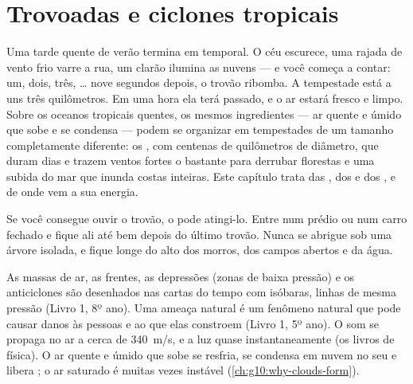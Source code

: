 \chapter{Trovoadas e ciclones tropicais}\label{ch:g10:storms-and-cyclones}

Uma tarde quente de verão termina em temporal. O céu escurece, uma rajada
de vento frio varre a rua, um clarão ilumina as nuvens --- e você começa a
contar: um, dois, três, \ldots{} nove segundos depois, o trovão ribomba. A
tempestade está a uns três quilômetros. Em uma hora ela terá passado, e o ar
estará fresco e limpo. Sobre os oceanos tropicais quentes, os mesmos
ingredientes --- ar quente e úmido que sobe e se condensa --- podem se
organizar em tempestades de um tamanho completamente diferente: os , com centenas de quilômetros de diâmetro, que duram dias e trazem
ventos fortes o bastante para derrubar florestas e uma subida do mar que
inunda costas inteiras. Este capítulo trata das , dos  e
dos , e de onde vem a sua energia.

\begin{safety}
Se você consegue ouvir o trovão, o  pode atingi-lo. Entre num prédio ou
num carro fechado e fique ali até bem depois do último trovão. Nunca se
abrigue sob uma árvore isolada, e fique longe do alto dos morros, dos campos
abertos e da água.
\end{safety}

\begin{recall}
As massas de ar, as frentes, as depressões (zonas de baixa pressão) e os
anticiclones são desenhados nas cartas do tempo com isóbaras, linhas de
mesma pressão (Livro 1, 8º ano). Uma ameaça natural é um fenômeno natural
que pode causar danos às pessoas e ao que elas constroem (Livro 1, 5º ano).
O som se propaga no ar a cerca de \qty{340}{m/s}, e a luz quase
instantaneamente (os livros de física). O ar quente e úmido que sobe se
resfria, se condensa em nuvem no seu  e libera ; o ar saturado é muitas vezes instável
(\cref{ch:g10:why-clouds-form}).
\end{recall}

